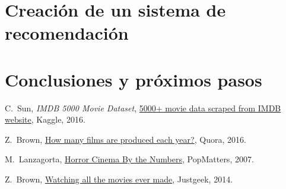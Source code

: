 \documentclass{article}
\begin{document}
\clearpage

\section{Creación de un sistema de recomendación}

\blindtext

\clearpage

\section{Conclusiones y próximos pasos}

\blindtext

\clearpage

\begin{thebibliography}{1}


C.~Sun, \emph{IMDB 5000 Movie Dataset}, \href{https://www.kaggle.com/deepmatrix/imdb-5000-movie-dataset}{5000+ movie data scraped from IMDB website}, \relax Kaggle, 2016.

Z.~Brown, \href{https://www.quora.com/How-many-films-are-produced-each-year}{How many films are produced each year?}, \relax Quora, 2016.

M.~Lanzagorta, \href{http://www.popmatters.com/column/horror-cinema-by-the-numbers/}{Horror Cinema By the Numbers}, \relax PopMatters, 2007.

Z.~Brown, \href{http://www.justgeek.de/watching-all-the-movies-ever-made/}{Watching all the movies ever made}, \relax Justgeek, 2014.

\end{thebibliography}

%
\end{document}
